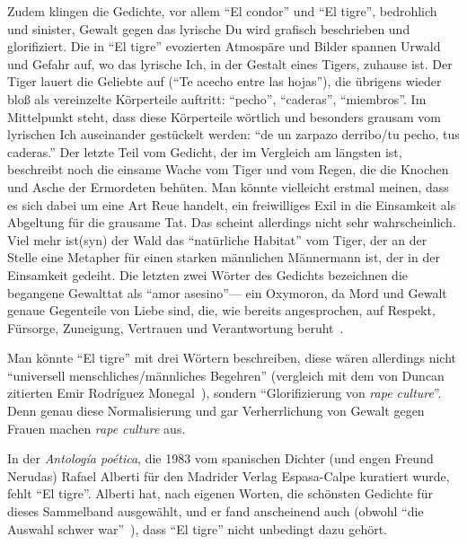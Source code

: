 Zudem klingen die Gedichte, vor allem ``El condor'' und ``El tigre'', bedrohlich und sinister, Gewalt gegen das lyrische Du wird grafisch beschrieben und glorifiziert.
Die in ``El tigre'' evozierten Atmospäre und Bilder spannen Urwald und Gefahr auf, wo das lyrische Ich, in der Gestalt eines Tigers, zuhause ist.
Der Tiger lauert die Geliebte auf (``Te acecho entre las hojas''), die übrigens wieder bloß als vereinzelte Körperteile auftritt: ``pecho'', ``caderas'', ``miembros''.
Im Mittelpunkt steht, dass diese Körperteile wörtlich und besonders grausam vom lyrischen Ich auseinander gestückelt werden:
``de un zarpazo derribo/tu pecho, tus caderas.''
Der letzte Teil vom Gedicht, der im Vergleich am längsten ist, beschreibt noch die einsame Wache vom Tiger und vom Regen, die die Knochen und Asche der Ermordeten behüten.
Man könnte vielleicht erstmal meinen, dass es sich dabei um eine Art Reue handelt, ein freiwilliges Exil in die Einsamkeit als Abgeltung für die grausame Tat.
Das scheint allerdings nicht sehr wahrscheinlich.
Viel mehr ist(syn) der Wald das ``natürliche Habitat'' vom Tiger, der an der Stelle eine Metapher für einen starken männlichen Männermann ist, der in der Einsamkeit gedeiht.
Die letzten zwei Wörter des Gedichts bezeichnen die begangene Gewalttat als ``amor asesino''—
ein Oxymoron, da Mord und Gewalt genaue Gegenteile von Liebe sind, die, wie bereits angesprochen, auf Respekt, Fürsorge, Zuneigung, Vertrauen und Verantwortung beruht~\cite{hooks2001}.

Man könnte ``El tigre'' mit drei Wörtern beschreiben, diese wären allerdings nicht ``universell menschliches/männliches Begehren'' (vergleich mit dem von Duncan zitierten Emir Rodríguez Monegal~\cite{Duncan1992}), sondern ``Glorifizierung von \textit{rape culture}''.
Denn genau diese Normalisierung und gar Verherrlichung von Gewalt gegen Frauen machen \textit{rape culture} aus.

\begin{comment}
Rape ist nicht Liebe oder Desire; Es geht um Macht;
Und genau durch solche Aussagen, die solche Vorstellungen normalisieren, anstatt sie als Gewalt zu diffamieren, wird diese weiter aufrechterhalten.
\end{comment}

In der \textit{Antología poética}, die 1983 vom spanischen Dichter (und engen Freund Nerudas) Rafael Alberti für den Madrider Verlag Espasa-Calpe kuratiert wurde, fehlt ``El tigre''.
Alberti hat, nach eigenen Worten, die schönsten Gedichte für dieses Sammelband ausgewählt, und er fand anscheinend auch (obwohl ``die Auswahl schwer war''~\cite{Alberti1983}), dass ``El tigre'' nicht unbedingt dazu gehört.


